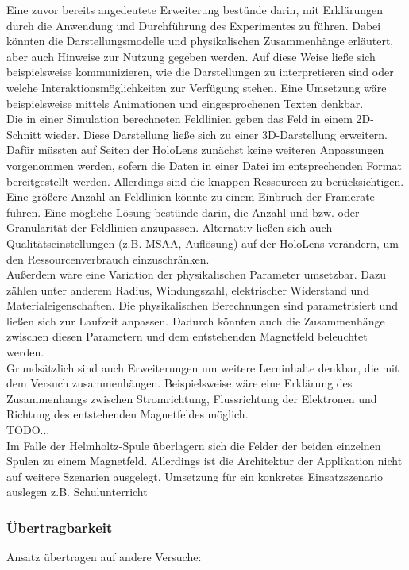 Eine zuvor bereits angedeutete Erweiterung bestünde darin, mit Erklärungen durch die Anwendung und Durchführung des Experimentes zu führen. Dabei könnten die Darstellungsmodelle und physikalischen Zusammenhänge erläutert, aber auch Hinweise zur Nutzung gegeben werden. Auf diese Weise ließe sich beispielsweise kommunizieren, wie die Darstellungen zu interpretieren sind oder welche Interaktionsmöglichkeiten zur Verfügung stehen. Eine Umsetzung wäre beispielsweise mittels Animationen und eingesprochenen Texten denkbar.\\

Die in einer Simulation berechneten Feldlinien geben das Feld in einem 2D-Schnitt wieder. Diese Darstellung ließe sich zu einer 3D-Darstellung erweitern. Dafür müssten auf Seiten der HoloLens zunächst keine weiteren Anpassungen vorgenommen werden, sofern die Daten in einer Datei im entsprechenden Format bereitgestellt werden. Allerdings sind die knappen Ressourcen zu berücksichtigen. Eine größere Anzahl an Feldlinien könnte zu einem Einbruch der Framerate führen. Eine mögliche Lösung bestünde darin, die Anzahl und bzw. oder Granularität der Feldlinien anzupassen. Alternativ ließen sich auch Qualitätseinstellungen (z.B. MSAA, Auflösung) auf der HoloLens verändern, um den Ressourcenverbrauch einzuschränken.\\

Außerdem wäre eine Variation der physikalischen Parameter umsetzbar. Dazu zählen unter anderem Radius, Windungszahl, elektrischer Widerstand und Materialeigenschaften. Die physikalischen Berechnungen sind parametrisiert und ließen sich zur Laufzeit anpassen. Dadurch könnten auch die Zusammenhänge zwischen diesen Parametern und dem entstehenden Magnetfeld beleuchtet werden.\\

Grundsätzlich sind auch Erweiterungen um weitere Lerninhalte denkbar, die mit dem Versuch zusammenhängen. Beispielsweise wäre eine Erklärung des Zusammenhangs zwischen Stromrichtung, Flussrichtung der Elektronen und Richtung des entstehenden Magnetfeldes möglich.\\

TODO...\\
Im Falle der Helmholtz-Spule überlagern sich die Felder der beiden einzelnen Spulen zu einem Magnetfeld.
Allerdings ist die Architektur der Applikation nicht auf weitere Szenarien ausgelegt. 
Umsetzung für ein konkretes Einsatzszenario auslegen z.B. Schulunterricht

\subsubsection{Übertragbarkeit}
Ansatz übertragen auf andere Versuche:

